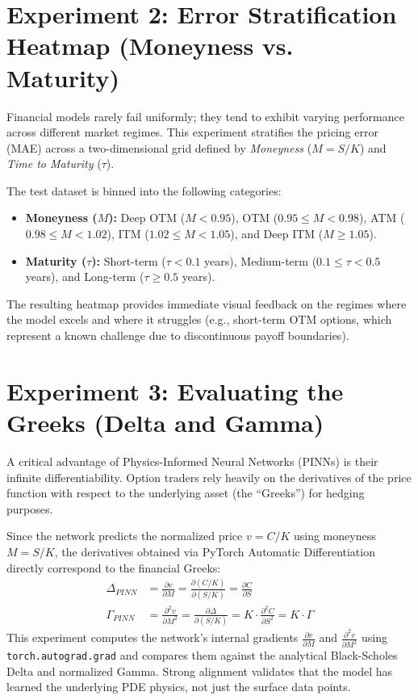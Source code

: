 \documentclass[11pt]{article}
\begin{document}
\section{Experiment 2: Error Stratification Heatmap (Moneyness vs. Maturity)}
Financial models rarely fail uniformly; they tend to exhibit varying performance across different market regimes. This experiment stratifies the pricing error (MAE) across a two-dimensional grid defined by \textit{Moneyness} ($M = S/K$) and \textit{Time to Maturity} ($\tau$).

The test dataset is binned into the following categories:
\begin{itemize}
    \item \textbf{Moneyness ($M$):} Deep OTM ($M < 0.95$), OTM ($0.95 \le M < 0.98$), ATM ($0.98 \le M < 1.02$), ITM ($1.02 \le M < 1.05$), and Deep ITM ($M \ge 1.05$).
    \item \textbf{Maturity ($\tau$):} Short-term ($\tau < 0.1$ years), Medium-term ($0.1 \le \tau < 0.5$ years), and Long-term ($\tau \ge 0.5$ years).
\end{itemize}
The resulting heatmap provides immediate visual feedback on the regimes where the model excels and where it struggles (e.g., short-term OTM options, which represent a known challenge due to discontinuous payoff boundaries).

\section{Experiment 3: Evaluating the Greeks (Delta and Gamma)}
A critical advantage of Physics-Informed Neural Networks (PINNs) is their infinite differentiability. Option traders rely heavily on the derivatives of the price function with respect to the underlying asset (the ``Greeks'') for hedging purposes. 

Since the network predicts the normalized price $v = C/K$ using moneyness $M = S/K$, the derivatives obtained via PyTorch Automatic Differentiation directly correspond to the financial Greeks:
\begin{align}
    \Delta_{PINN} &= \frac{\partial v}{\partial M} = \frac{\partial (C/K)}{\partial (S/K)} = \frac{\partial C}{\partial S} \\
    \Gamma_{PINN} &= \frac{\partial^2 v}{\partial M^2} = \frac{\partial \Delta}{\partial (S/K)} = K \cdot \frac{\partial^2 C}{\partial S^2} = K \cdot \Gamma
\end{align}
This experiment computes the network's internal gradients $\frac{\partial v}{\partial M}$ and $\frac{\partial^2 v}{\partial M^2}$ using \texttt{torch.autograd.grad} and compares them against the analytical Black-Scholes Delta and normalized Gamma. Strong alignment validates that the model has learned the underlying PDE physics, not just the surface data points.
\end{document}
